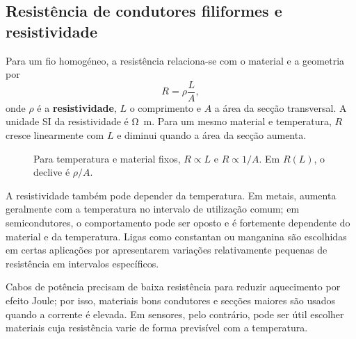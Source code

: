 \documentclass[11pt,a4paper,oneside]{book}
\begin{document}
\subsection*{Resistência de condutores filiformes e resistividade}
Para um fio homogéneo, a resistência relaciona-se com o material e a geometria por
\[
R=\rho\frac{L}{A},
\]
onde $\rho$ é a \textbf{resistividade}, $L$ o comprimento e $A$ a área da secção transversal. A unidade SI da resistividade é \si{\ohm.m}. Para um mesmo material e temperatura, $R$ cresce linearmente com $L$ e diminui quando a área da secção aumenta.

\begin{figure}[H]
\centering
\begin{minipage}{.48\textwidth}
\centering
{}
\end{minipage}\hfill
\begin{minipage}{.48\textwidth}
\centering
{}
\end{minipage}
\caption{Para temperatura e material fixos, $R\propto L$ e $R\propto1/A$. Em $R(L)$, o declive é $\rho/A$.}
\end{figure}

A resistividade também pode depender da temperatura. Em metais, aumenta geralmente com a temperatura no intervalo de utilização comum; em semicondutores, o comportamento pode ser oposto e é fortemente dependente do material e da temperatura. Ligas como constantan ou manganina são escolhidas em certas aplicações por apresentarem variações relativamente pequenas de resistência em intervalos específicos.

\begin{mundo}
Cabos de potência precisam de baixa resistência para reduzir aquecimento por efeito Joule; por isso, materiais bons condutores e secções maiores são usados quando a corrente é elevada. Em sensores, pelo contrário, pode ser útil escolher materiais cuja resistência varie de forma previsível com a temperatura.
\end{mundo}
\end{document}
